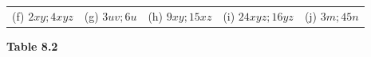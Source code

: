 {{\begin{center}
\begin{xtabular}[t]{|l|l|l|l|l|}
     \tabularnewline{}
        (f) $2xy;4xyz$\hspace{5ex} &
        (g) $3uv;6u$ &
        (h) $9xy;15xz$\hspace{5ex} &
        (i) $24xyz;16yz$\hspace{5ex} &
        (j) $3m;45n$%
     \tabularnewline{}
    \end{xtabular}
      \end{center}
    \begin{center}{\small\bfseries Table 8.2}\end{center}
          } %
        }{%
        }
